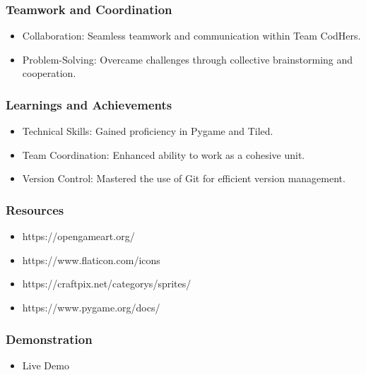 \documentclass{beamer}
\begin{document}
\begin{frame}
\frametitle{Teamwork and Coordination}
\begin{itemize}
  \item Collaboration: Seamless teamwork and communication within Team CodHers.
  \item Problem-Solving: Overcame challenges through collective brainstorming and cooperation.
\end{itemize}
\end{frame}

\begin{frame}
\frametitle{Learnings and Achievements}
\begin{itemize}
  \item Technical Skills: Gained proficiency in Pygame and Tiled.
  \item Team Coordination: Enhanced ability to work as a cohesive unit.
  \item Version Control: Mastered the use of Git for efficient version management.
\end{itemize}
\end{frame}


\begin{frame}
  \frametitle{Resources}
  \begin{itemize}
    \item https://opengameart.org/
    \item https://www.flaticon.com/icons
    \item https://craftpix.net/categorys/sprites/ 
    \item https://www.pygame.org/docs/
  \end{itemize}
  \end{frame}


\begin{frame}
\frametitle{Demonstration}
\begin{itemize}
  \item Live Demo
\end{itemize}
\end{frame}



\begin{frame}
\frametitle{}
\end{frame}
\end{document}
